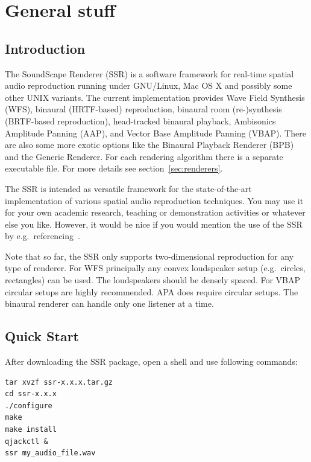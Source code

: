 \section{General stuff}

\subsection{Introduction}

The SoundScape Renderer (SSR) is a software framework for real-time spatial
audio reproduction running under GNU/Linux, Mac OS X and possibly some other UNIX
variants.
The current implementation provides Wave Field Synthesis (WFS),
binaural (HRTF-based) reproduction, binaural room (re-)synthesis (BRTF-based
reproduction), head-tracked binaural playback, Ambisonics Amplitude Panning 
(AAP), and Vector Base Amplitude Panning (VBAP).
There are also some more exotic options like the Binaural Playback Renderer
(BPB) and the Generic Renderer.
For each rendering algorithm there is a separate executable file.
For more details see section~\ref{sec:renderers}.

The SSR is intended as versatile framework for the state-of-the-art
implementation of various spatial audio reproduction techniques. You may use it
for your own academic research, teaching or demonstration activities or whatever
else you like.
However, it would be nice if you would mention the use of the SSR by
e.g.\ referencing~\cite{Geier08:AES}.

Note that so far, the SSR only supports two-dimensional reproduction for any
type of renderer. For WFS principally any convex loudspeaker setup
(e.g.\ circles, rectangles) can be used. The loudspeakers should be densely
spaced. For VBAP circular setups are highly recommended. APA does require
circular setups. The binaural renderer can handle only one listener at a time.

\subsection{Quick Start}
\label{sec:quick_start}

After downloading the SSR package, open a shell and use following commands:

\begin{verbatim}
tar xvzf ssr-x.x.x.tar.gz
cd ssr-x.x.x
./configure
make
make install
qjackctl &
ssr my_audio_file.wav
\end{verbatim}

